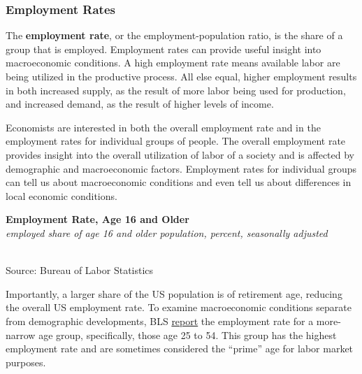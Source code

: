\documentclass{report}
\makeatletter
\newcommand{\tbllink}[1]{\href{https://raw.githubusercontent.com/bdecon/US-chartbook/master/chartbook/data/#1}{\faTable}}
\newcommand*\short[1]{\expandafter\@gobbletwo\number\numexpr#1\relax}
\newcommand{\dateaxisticks}{
		date coordinates in=x, axis line style={draw=none},
		xmax={2024-01-31},
		max space between ticks=40,	    
		xtick={{1990-01-01}, {1992-01-01}, {1994-01-01}, 
			{1996-01-01}, {1998-01-01}, {2000-01-01}, 
			{2002-01-01}, {2004-01-01}, {2006-01-01},
			{2008-01-01}, {2010-01-01}, {2012-01-01}, {2014-01-01},
		    {2016-01-01}, {2018-01-01}, {2020-01-01}, {2022-01-01}, 
		    {2024-01-01}, {2026-01-01}},
		minor xtick={{1989-01-01}, {1991-01-01}, {1993-01-01},
			{1995-01-01}, {1997-01-01}, {1999-01-01}, 
			{2001-01-01}, {2003-01-01}, {2005-01-01}, {2007-01-01},
		    {2009-01-01}, {2011-01-01}, {2013-01-01}, {2015-01-01},
		    {2017-01-01}, {2019-01-01}, {2021-01-01}, {2023-01-01}, 
		    {2025-01-01}, {2027-01-01}},
		enlarge y limits={0.06}, enlarge x limits={0.01},
		xticklabel style={align=center, yshift=-2pt}, tick label style={inner sep=0pt},
		}
\newcommand{\stdline}[4]{\addplot[very thick, no markers, color=#1] 
		table [x=#2, y=#3, col sep=comma] {#4};	}
\newcommand{\rbars}{
		\fill[color=black!10] (axis cs:{1990-07-01},\pgfkeysvalueof{/pgfplots/ymin})
			rectangle (axis cs:{1991-03-01}, \pgfkeysvalueof{/pgfplots/ymax});
		\fill[color=black!10] (axis cs:{2007-12-01},\pgfkeysvalueof{/pgfplots/ymin})
			rectangle (axis cs:{2009-07-01}, \pgfkeysvalueof{/pgfplots/ymax});
		\fill[color=black!10] (axis cs:{2001-03-01},\pgfkeysvalueof{/pgfplots/ymin})
			rectangle (axis cs:{2001-11-01}, \pgfkeysvalueof{/pgfplots/ymax});
		\fill[color=black!10] (axis cs:{2020-02-01},\pgfkeysvalueof{/pgfplots/ymin})
			rectangle (axis cs:{2020-05-01}, \pgfkeysvalueof{/pgfplots/ymax});}
\makeatother
\begin{document}
{\begin{minipage}{1.0\textwidth} 
\subsubsection*{Employment Rates} 
\vspace{-0.5mm}
\small The \textbf{employment rate}, or the employment-population ratio, is the share of a group that is employed. Employment rates can provide useful insight into macroeconomic conditions. A high employment rate means available labor are being utilized in the productive process. All else equal, higher employment results in both increased supply, as the result of more labor being used for production, and increased demand, as the result of higher levels of income.

Economists are interested in both the overall employment rate and in the employment rates for individual groups of people. The overall employment rate provides insight into the overall utilization of labor of a society and is affected by demographic and macroeconomic factors. Employment rates for individual groups can tell us about macroeconomic conditions and even tell us about differences in local economic conditions. 

 
\vspace{1mm}

\normalsize \textbf{Employment Rate, Age 16 and Older}\\
\footnotesize{\textit{employed share of age 16 and older population, percent, seasonally adjusted}}\\
\hspace*{-1mm} \\
\footnotesize{Source: Bureau of Labor Statistics} \hfill \tbllink{epop.csv}
\vspace{3mm} 

\small Importantly, a larger share of the US population is of retirement age, reducing the overall US employment rate. To examine macroeconomic conditions separate from demographic developments, BLS \href{LNS12300060}{report} the employment rate for a more-narrow age group, specifically, those age 25 to 54. This group has the highest employment rate and are sometimes considered the ``prime'' age for labor market purposes. 


\end{minipage}}
\end{document}
